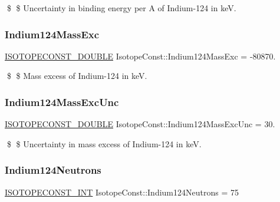\$ \$ Uncertainty in binding energy per A of Indium-\/124 in keV. \mbox{\label{group___isotope_const-_indium-_in124_ga5c674718d81caccefa13a9beed98010d}} 
\subsubsection{\texorpdfstring{Indium124\+Mass\+Exc}{Indium124MassExc}}
{\footnotesize\ttfamily \mbox{\hyperlink{group___isotope_const-_macros_ga8f45a7272ce02c0b4c65c44636ed719a}{I\+S\+O\+T\+O\+P\+E\+C\+O\+N\+S\+T\+\_\+\+D\+O\+U\+B\+LE}} Isotope\+Const\+::\+Indium124\+Mass\+Exc = -\/80870.}

\$ \$ Mass excess of Indium-\/124 in keV. \mbox{\label{group___isotope_const-_indium-_in124_ga725717f9a2a69c526260d8bcbc3eb637}} 
\subsubsection{\texorpdfstring{Indium124\+Mass\+Exc\+Unc}{Indium124MassExcUnc}}
{\footnotesize\ttfamily \mbox{\hyperlink{group___isotope_const-_macros_ga8f45a7272ce02c0b4c65c44636ed719a}{I\+S\+O\+T\+O\+P\+E\+C\+O\+N\+S\+T\+\_\+\+D\+O\+U\+B\+LE}} Isotope\+Const\+::\+Indium124\+Mass\+Exc\+Unc = 30.}

\$ \$ Uncertainty in mass excess of Indium-\/124 in keV. \mbox{\label{group___isotope_const-_indium-_in124_ga79d042f4b38b91a31d4a321d740e54dc}} 
\subsubsection{\texorpdfstring{Indium124\+Neutrons}{Indium124Neutrons}}
{\footnotesize\ttfamily \mbox{\hyperlink{group___isotope_const-_macros_ga5f18360b3e99483a35c32d789e62621c}{I\+S\+O\+T\+O\+P\+E\+C\+O\+N\+S\+T\+\_\+\+I\+NT}} Isotope\+Const\+::\+Indium124\+Neutrons = 75}

